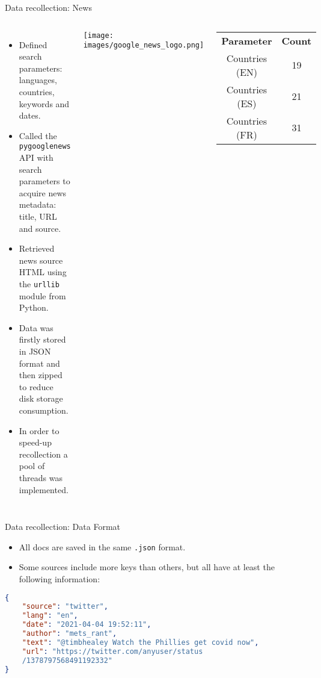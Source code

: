 \documentclass[aspectratio=169]{beamer}
\begin{document}
\begin{frame}{Data recollection: News}
    \begin{columns}
            \begin{itemize}
                \item Defined search parameters: languages, countries, keywords and dates.
                \item Called the \texttt{pygooglenews} API with search parameters to acquire news metadata: title, URL and source.
                \item Retrieved news source HTML using the \texttt{urllib} module from Python. 
                \item Data was firstly stored in JSON format and then zipped to reduce disk storage consumption.
                \item In order to speed-up recollection a pool of threads was implemented.
            \end{itemize}
    
            \centering
            \texttt{[image: images/google\_news\_logo.png]}
            \begin{table}[h]
                \centering
                \begin{tabular}{c|c}
                    \textbf{Parameter} & \textbf{Count} \\
                    Countries (EN) & 19 \\
                    Countries (ES) & 21 \\
                    Countries (FR) & 31
                \end{tabular}
                \label{tab:label_for_table}
            \end{table}
    \end{columns}
\end{frame}

\begin{frame}[fragile]{Data recollection: Data Format}

\begin{itemize}
    \item All docs are saved in the same \texttt{.json} format.
    
    \item Some sources include more keys than others, but all have at least the following information:
\end{itemize}

    \begin{lstlisting}[language=json,firstnumber=1]
{
    "source": "twitter",
    "lang": "en",
    "date": "2021-04-04 19:52:11",
    "author": "mets_rant",
    "text": "@timbhealey Watch the Phillies get covid now",
    "url": "https://twitter.com/anyuser/status
    /1378797568491192332"
}

\end{lstlisting}
\end{frame}
\end{document}
